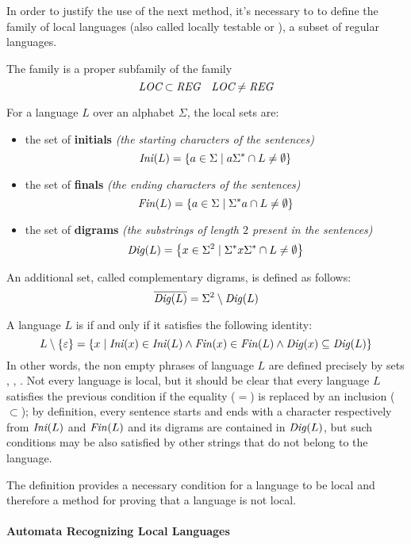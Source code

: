 \documentclass[english]{article}
\begin{document}
In order to justify the use of the next method, it's necessary to to define the family of local languages (also called locally testable or \LOC), a subset of regular languages.

The \LOC family is a proper subfamily of the \REG family
\[ \textit{LOC} \subset \textit{REG} \quad \textit{LOC} \neq \textit{REG} \]

For a language \(L\) over an alphabet \(\Sigma\), the local sets are:

\begin{itemize}
  \item the set of \textbf{initials} \textit{(the starting characters of the sentences)}
        \[ \textit{Ini}\hspace{0.1ex}(L) = \left\{ a \in \Sigma \mid a \Sigma^\ast \cap L \neq \emptyset \right\} \]
  \item the set of \textbf{finals} \textit{(the ending characters of the sentences)}
        \[ \textit{Fin}\hspace{0.1ex}(L) = \left\{ a \in \Sigma \mid \Sigma^\ast a \cap L \neq \emptyset \right\} \]
  \item the set of \textbf{digrams} \textit{(the substrings of length \(2\) present in the sentences)}
        \[ \textit{Dig}\hspace{0.1ex}(L) = \left\{ x \in \Sigma^2 \mid \Sigma^\ast x \Sigma^\ast \cap L \neq \emptyset \right\} \]
\end{itemize}

An additional set, called complementary digrams, is defined as follows:
\[ \overline{\textit{Dig}\hspace{0.1ex}(L)} = \Sigma^2 \setminus \textit{Dig}\hspace{0.1ex}(L) \]

\bigskip
A language \(L\) is \LOC if and only if it satisfies the following identity:
\[ L \setminus \left\{ \varepsilon \right\} = \left\{ x \mid \textit{Ini}\hspace{0.1ex}(x) \in \textit{Ini}\hspace{0.1ex}(L) \land \textit{Fin}\hspace{0.1ex}(x) \in \textit{Fin}\hspace{0.1ex}(L) \land \textit{Dig}\hspace{0.1ex}(x) \subseteq \textit{Dig}\hspace{0.1ex}(L) \right\} \]
In other words, the non empty phrases of language \(L\) are defined precisely by sets \Ini, \Fin, \Dig.
Not every language is local, but it should be clear that every language \(L\) satisfies the previous condition if the equality (\(=\)) is replaced by an inclusion (\(\subset\));
by definition, every sentence starts and ends with a character respectively from \(\textit{Ini}\hspace{0.1ex}(L)\) and \(\textit{Fin}\hspace{0.1ex}(L)\) and its digrams are contained in \(\textit{Dig}\hspace{0.1ex}(L)\), but such conditions may be also satisfied by other strings that do not belong to the language.

The definition provides a necessary condition for a language to be local and therefore a method for proving that a language is not local.

\paragraph{Automata Recognizing Local Languages}
\end{document}
